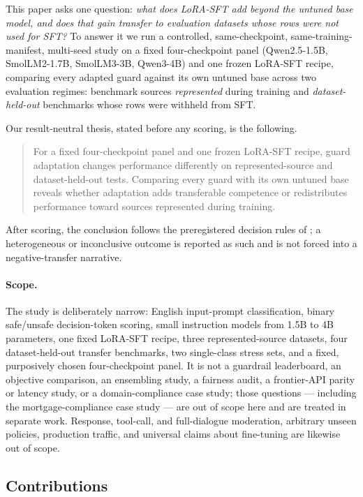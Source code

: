 \documentclass[sigconf,nonacm]{acmart}
\begin{document}
This paper asks one question: \emph{what does LoRA-SFT add beyond the untuned base model, and does that gain transfer to evaluation datasets whose rows were not used for SFT?} To answer it we run a controlled, same-checkpoint, same-training-manifest, multi-seed study on a fixed four-checkpoint panel (Qwen2.5-1.5B, SmolLM2-1.7B, SmolLM3-3B, Qwen3-4B) and one frozen LoRA-SFT recipe, comparing every adapted guard against its own untuned base across two evaluation regimes: benchmark sources \emph{represented} during training and \emph{dataset-held-out} benchmarks whose rows were withheld from SFT.

Our result-neutral thesis, stated before any scoring, is the following.

\begin{quote}
For a fixed four-checkpoint panel and one frozen LoRA-SFT recipe, guard adaptation changes performance differently on represented-source and dataset-held-out tests. Comparing every guard with its own untuned base reveals whether adaptation adds transferable competence or redistributes performance toward sources represented during training.
\end{quote}

After scoring, the conclusion follows the preregistered decision rules of ; a heterogeneous or inconclusive outcome is reported as such and is not forced into a negative-transfer narrative.

\paragraph{Scope.} The study is deliberately narrow: English input-prompt classification, binary safe/unsafe decision-token scoring, small instruction models from 1.5B to 4B parameters, one fixed LoRA-SFT recipe, three represented-source datasets, four dataset-held-out transfer benchmarks, two single-class stress sets, and a fixed, purposively chosen four-checkpoint panel. It is not a guardrail leaderboard, an objective comparison, an ensembling study, a fairness audit, a frontier-API parity or latency study, or a domain-compliance case study; those questions --- including the mortgage-compliance case study --- are out of scope here and are treated in separate work. Response, tool-call, and full-dialogue moderation, arbitrary unseen policies, production traffic, and universal claims about fine-tuning are likewise out of scope.

\subsection{Contributions}
\label{sec:contributions}
\end{document}
